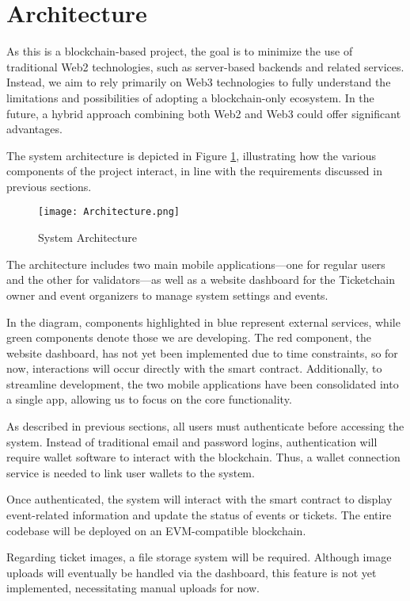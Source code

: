 \section{Architecture}
\label{sec:architecture}

As this is a blockchain-based project, the goal is to minimize the use of
traditional Web2 technologies, such as server-based backends and related
services. Instead, we aim to rely primarily on Web3 technologies to fully
understand the limitations and possibilities of adopting a blockchain-only
ecosystem. In the future, a hybrid approach combining both Web2 and Web3 could
offer significant advantages.

The system architecture is depicted in Figure \ref{fig:architecture},
illustrating how the various components of the project interact, in line with
the requirements discussed in previous sections.

\begin{figure}[H]
    \centering
    \texttt{[image: Architecture.png]}
    \caption{System Architecture}
    \label{fig:architecture}
\end{figure}

The architecture includes two main mobile applications—one for regular users
and the other for validators—as well as a website dashboard for the Ticketchain
owner and event organizers to manage system settings and events.

In the diagram, components highlighted in blue represent external services,
while green components denote those we are developing. The red component, the
website dashboard, has not yet been implemented due to time constraints, so for
now, interactions will occur directly with the smart contract. Additionally, to
streamline development, the two mobile applications have been consolidated into
a single app, allowing us to focus on the core functionality.

As described in previous sections, all users must authenticate before accessing
the system. Instead of traditional email and password logins, authentication
will require wallet software to interact with the blockchain. Thus, a wallet
connection service is needed to link user wallets to the system.

Once authenticated, the system will interact with the smart contract to display
event-related information and update the status of events or tickets. The
entire codebase will be deployed on an EVM-compatible blockchain.

Regarding ticket images, a file storage system will be required. Although image
uploads will eventually be handled via the dashboard, this feature is not yet
implemented, necessitating manual uploads for now.
